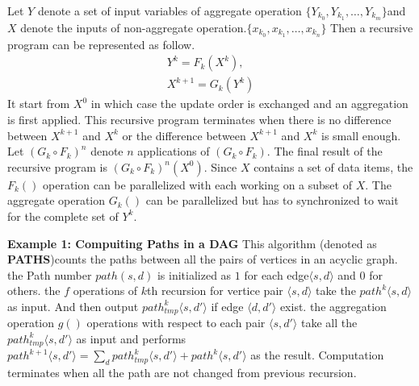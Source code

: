 Let $Y$ denote a set of input variables of aggregate operation $\{Y_{k_0},Y_{k_1},\dots,Y_{k_m}\}$and $X$ denote the inputs of non-aggregate  operation.$\{x_{k_0},x_{k_1},\dots,x_{k_n}\}$%
Then a recursive program can be represented as follow.
\begin{equation}
\label{eq:recursive2}
\begin{aligned}
Y^{k}=F_k(X^k),\\
X^{k+1}=G_k(Y^k)
\end{aligned}
\end{equation}
It  start from $X^0$ in which case the update order is exchanged and an aggregation is first applied. This recursive program terminates when there is no difference between $X^{k+1}$ and $X^k$ or the difference between $X^{k+1}$ and $X^k$ is small enough. Let $(G_k\circ F_k)^n$ denote $n$ applications of $(G_k\circ F_k)$. The final result of the recursive program is $(G_k\circ F_k)^n(X^0)$. Since $X$ contains a set of data items, the $F_k()$ operation can be parallelized with each working on a subset of $X$. The aggregate operation $G_k()$ can be parallelized  but has to synchronized to wait for the complete set of $Y^{k}$.

\textbf{Example 1: Compuiting Paths in a DAG} This algorithm (denoted as \textbf{PATHS})counts the paths between all the pairs of vertices in an acyclic graph. the Path number $path(s,d)$ is initialized as $1$ for each edge$\langle s,d\rangle$ and $0$ for others. the $f$ operations of $k$th recursion for vertice pair $\langle s,d\rangle$ take the $path^k\langle s,d\rangle$ as input. And then output $path_{tmp}^k\langle s,d'\rangle$ if edge $\langle d,d'\rangle$ exist. the aggregation operation $g()$ operations with respect to each pair $\langle s,d'\rangle$ take all the $path_{tmp}^k\langle s,d'\rangle$ as input and performs $path^{k+1}\langle s,d'\rangle=\sum_d path_{tmp}^k\langle s,d'\rangle+path^k\langle s,d'\rangle$ as the result. Computation terminates when all the path are not changed from previous recursion.

